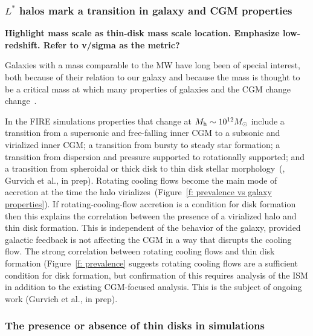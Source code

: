 \documentclass[fleqn,usenatbib]{mnras}
\begin{document}
\subsubsection{$L^*$ halos mark a transition in galaxy and CGM properties}
\label{s: disk formation -- transition}

\textbf{
Highlight mass scale as thin-disk mass scale location.
Emphasize low-redshift.
Refer to v/sigma as the metric?
}

Galaxies with a mass comparable to the MW have long been of special interest, both because of their relation to our galaxy and because the mass is thought to be a critical mass at which many properties of galaxies and the CGM change change~\citep[e.g.][]{Fielding2017, Correa2017, Dekel2019a}.

In the FIRE simulations properties that change at $M_{\rm h}\sim10^{12} M_\odot$ include a transition from a supersonic and free-falling inner CGM to a subsonic and virialized inner CGM;
a transition from bursty to steady star formation;
a transition from dispersion and pressure supported to rotationally supported;
and a transition from spheroidal or thick disk to thin disk stellar morphology~(\citealt{El-Badry2018a, Stern2020, Yu2021}, Gurvich et al., in prep).
Rotating cooling flows become the main mode of accretion at the time the halo virializes~(Figure~\ref{f: prevalence vs galaxy properties}).
If rotating-cooling-flow accretion is a condition for disk formation then this explains the correlation between the presence of a virialized halo and thin disk formation.
This is independent of the behavior of the galaxy, provided galactic feedback is not affecting the CGM in a way that disrupts the cooling flow.
The strong correlation between rotating cooling flows and thin disk formation (Figure~\ref{f: prevalence} suggests rotating cooling flows are a sufficient condition for disk formation, but confirmation of this requires analysis of the ISM in addition to the existing CGM-focused analysis.
This is the subject of ongoing work (Gurvich et al., in prep).

\subsubsection{The presence or absence of thin disks in simulations}
\label{s: disk formation -- population}
\end{document}

